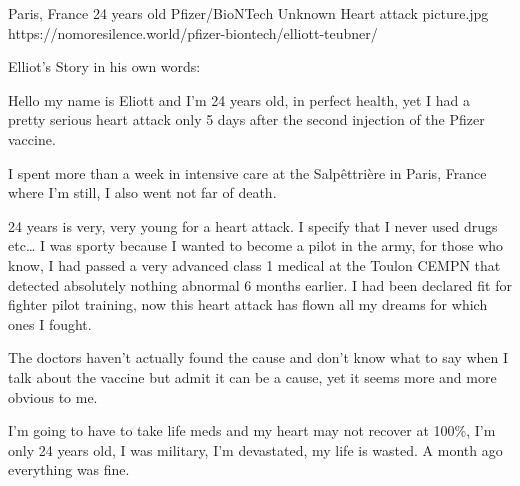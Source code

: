 {Paris, France}
{24 years old}
{Pfizer/BioNTech}
{Unknown}
{Heart attack}
{picture.jpg}
{https://nomoresilence.world/pfizer-biontech/elliott-teubner/}
{

Elliot’s Story in his own words:

Hello my name is Eliott and I’m 24 years old, in perfect health, yet I had a
pretty serious heart attack only 5 days after the second injection of the Pfizer
vaccine.

I spent more than a week in intensive care at the Salpêttrière in Paris, France
where I’m still, I also went not far of death.

24 years is very, very young for a heart attack. I specify that I never used
drugs etc… I was sporty because I wanted to become a pilot in the army, for
those who know, I had passed a very advanced class 1 medical at the Toulon CEMPN
that detected absolutely nothing abnormal 6 months earlier. I had been declared
fit for fighter pilot training, now this heart attack has flown all my dreams
for which ones I fought.

The doctors haven’t actually found the cause and don’t know what to say when I
talk about the vaccine but admit it can be a cause, yet it seems more and more
obvious to me.

I’m going to have to take life meds and my heart may not recover at 100\%, I’m
only 24 years old, I was military, I’m devastated, my life is wasted. A month
ago everything was fine.

}
